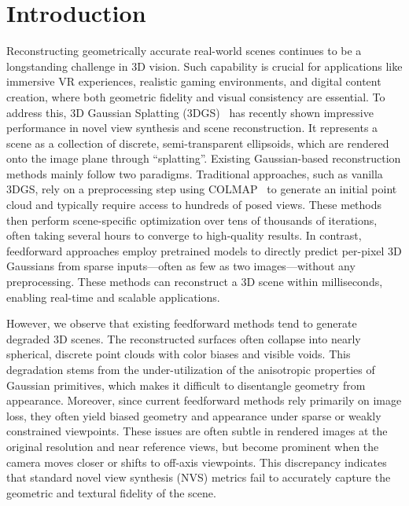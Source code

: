 \section{Introduction}
Reconstructing geometrically accurate real-world scenes continues to be a longstanding challenge in 3D vision. Such capability is crucial for applications like immersive VR experiences, realistic gaming environments, and digital content creation, where both geometric fidelity and visual consistency are essential.
To address this, 3D Gaussian Splatting (3DGS)~\cite{kerbl20233d} has recently shown impressive performance in novel view synthesis and scene reconstruction. It represents a scene as a collection of discrete, semi-transparent ellipsoids, which are rendered onto the image plane through “splatting”.
Existing Gaussian-based reconstruction methods mainly follow two paradigms. 
Traditional approaches, such as vanilla 3DGS, rely on a preprocessing step using COLMAP~\cite{schoenberger2016sfm} to generate an initial point cloud and typically require access to hundreds of posed views. These methods then perform scene-specific optimization over tens of thousands of iterations, often taking several hours to converge to high-quality results.
In contrast, feedforward approaches employ pretrained models to directly predict per-pixel 3D Gaussians from sparse inputs—often as few as two images—without any preprocessing. These methods can reconstruct a 3D scene within milliseconds, enabling real-time and scalable applications.

However, we observe that existing feedforward methods tend to generate degraded 3D scenes. The reconstructed surfaces often collapse into nearly spherical, discrete point clouds with color biases and visible voids. 
This degradation stems from the under-utilization of the anisotropic properties of Gaussian primitives, which makes it difficult to disentangle geometry from appearance. Moreover, since current feedforward methods rely primarily on image loss, they often yield biased geometry and appearance under sparse or weakly constrained viewpoints.
These issues are often subtle in rendered images at the original resolution and near reference views, but become prominent when the camera moves closer or shifts to off-axis viewpoints. This discrepancy indicates that standard novel view synthesis (NVS) metrics fail to accurately capture the geometric and textural fidelity of the scene.

